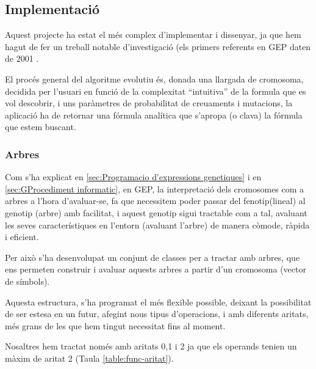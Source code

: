 \subsection{Implementació} %
\label{sub:GImplementacio}

Aquest projecte ha estat el més complex d'implementar i dissenyar, ja que hem
hagut de fer un treball notable d'investigació (els primers referents en GEP
daten de 2001 \cite{ferreira:2001}.

El procés general del algoritme evolutiu és, donada una llargada de cromosoma,
decidida per l'usuari en funció de la complexitat ``intuitiva'' de la formula
que es vol descobrir, i uns paràmetres de probabilitat de creuaments i
mutacions, la aplicació ha de retornar una fórmula analítica que s'apropa (o
clava) la fórmula que estem buscant.

\subsubsection{Arbres} %
\label{ssub:Arbres}

Com s'ha explicat en \ref{sec:Programacio d'expressions genetiques} i en
\ref{sec:GProcediment informatic}, en GEP, la interpretació dels
cromosomes com a arbres a l'hora d'avaluar-se, fa que necessitem poder passar
del fenotip(lineal) al genotip (arbre) amb facilitat, i aquest genotip sigui
tractable com a tal, avaluant les seves característiques en l'entorn (avaluant
l'arbre) de manera còmode, ràpida i eficient.

Per això s'ha desenvolupat un conjunt de classes per a tractar amb arbres, que
ens permeten construir i avaluar aquests arbres a partir d'un cromosoma (vector
de símbols).

Aquesta estructura, s'ha programat el més flexible possible, deixant la
possibilitat de ser estesa en un futur, afegint nous tipus d'operacions, i amb
diferents aritats, més grans de les que hem tingut necessitat fins al moment.

Nosaltres hem tractat només amb aritats 0,1 i 2 ja que els
operands tenien un màxim de aritat 2 (Taula \ref{table:func-aritat}).


